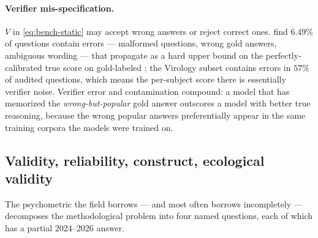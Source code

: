 \paragraph{Verifier mis-specification.} $V$ in \eqref{eq:bench-static}
may accept wrong answers or reject correct ones.
\citet{mmlu-redux-2024} find $6.49\%$ of  questions contain
errors --- malformed questions, wrong gold answers, ambiguous wording
--- that propagate as a hard upper bound on the perfectly-calibrated
true score on gold-labeled ; the Virology subset contains errors
in $57\%$ of audited questions, which means the per-subject score
there is essentially verifier noise. Verifier error and contamination
compound: a model that has memorized the \emph{wrong-but-popular}
gold answer outscores a model with better true reasoning, because the
wrong popular answers preferentially appear in the same training
corpora the models were trained on.

\subsection{Validity, reliability, construct, ecological validity}
\label{sec:measuring-validity}

The psychometric  the field borrows --- and most often
borrows incompletely --- decomposes the methodological problem into
four named questions, each of which has a partial 2024--2026 answer.

